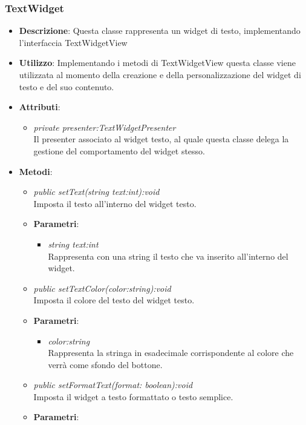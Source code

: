 \subsubsection{TextWidget}
\begin{itemize}
\item \textbf{Descrizione}: Questa classe rappresenta un widget di testo, implementando l'interfaccia TextWidgetView
\item \textbf{Utilizzo}: Implementando i metodi di TextWidgetView questa classe viene utilizzata al momento della creazione e della personalizzazione del widget di testo e del suo contenuto.
\item \textbf{Attributi}:
	\begin{itemize}
	\item \textit{private presenter:TextWidgetPresenter}\\
	Il presenter associato al widget testo, al quale questa classe delega la gestione del comportamento del widget stesso.
	\end{itemize}
\item \textbf{Metodi}:
	\begin{itemize}
	\item \textit{public setText(string text:int):void}\\
	Imposta il testo all'interno del widget testo.
		\item{\textbf{Parametri}: \begin{itemize}
		\item \textit{string text:int}\\
		Rappresenta con una string il testo che va inserito all'interno del widget.
		\end{itemize}}
	\item \textit{public setTextColor(color:string):void}\\
	Imposta il colore del testo del widget testo.
		\item{\textbf{Parametri}: \begin{itemize}
		\item \textit{color:string}\\
		Rappresenta la stringa in esadecimale corrispondente al colore che verrà come sfondo del bottone.
		\end{itemize}}
	\item \textit{public setFormatText(format: boolean):void}\\
	Imposta il widget a testo formattato o testo semplice.
		\item{\textbf{Parametri}: \begin{itemize}

\end{itemize}}
\end{itemize}
\end{itemize}
